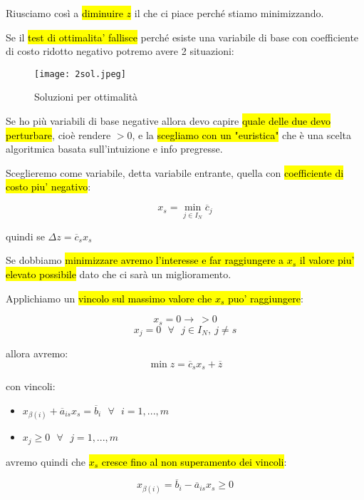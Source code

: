 Riusciamo così a \hl{diminuire $z$} il che ci piace perché stiamo minimizzando.

Se il \hl{test di ottimalita' fallisce} perché esiste una variabile di base con coefficiente di costo ridotto negativo potremo avere 2 situazioni:


\begin{figure}[H]
\centering
\texttt{[image: 2sol.jpeg]}
\caption{Soluzioni per ottimalità} 
\label{2sol}
\end{figure}


Se ho più variabili di base negative allora devo capire \hl{quale delle due devo perturbare}, cioè rendere $> 0$, e la \hl{scegliamo con un "euristica"} che è una scelta algoritmica basata sull'intuizione e info pregresse.

Sceglieremo come variabile, detta variabile entrante, quella con \hl{coefficiente di costo piu' negativo}:

$$x_s = \min_{j \in I_N} \overline{c}_j$$

quindi se $\Delta z = \overline{c}_s x_s$

Se dobbiamo \hl{minimizzare avremo l'interesse e far raggiungere a $x_s$ il valore piu' elevato possibile} dato che ci sarà un miglioramento.

Applichiamo un \hl{vincolo sul massimo valore che $x_s$ puo' raggiungere}:

$$x_s = 0 \to\ > 0$$
$$x_j = 0\ \ \ \forall\ \ \ j \in I_N,\ j \neq s$$

allora avremo:
$$\min z = \overline{c}_s x_s + \overline{z}$$

con vincoli:

\begin{itemize}
	\item $x_{\beta(i)} + \overline{a}_{is}x_s = \overline{b}_i\ \ \ \forall\ \ \ i = 1, ..., m$
	\item $x_j \geq 0\ \ \ \forall\ \ \ j = 1, ..., m$
\end{itemize}

avremo quindi che \hl{$x_s$ cresce fino al non superamento dei vincoli}:

$$x_{\beta(i)} = \overline{b}_i - \overline{a}_{is}x_s \geq 0$$

